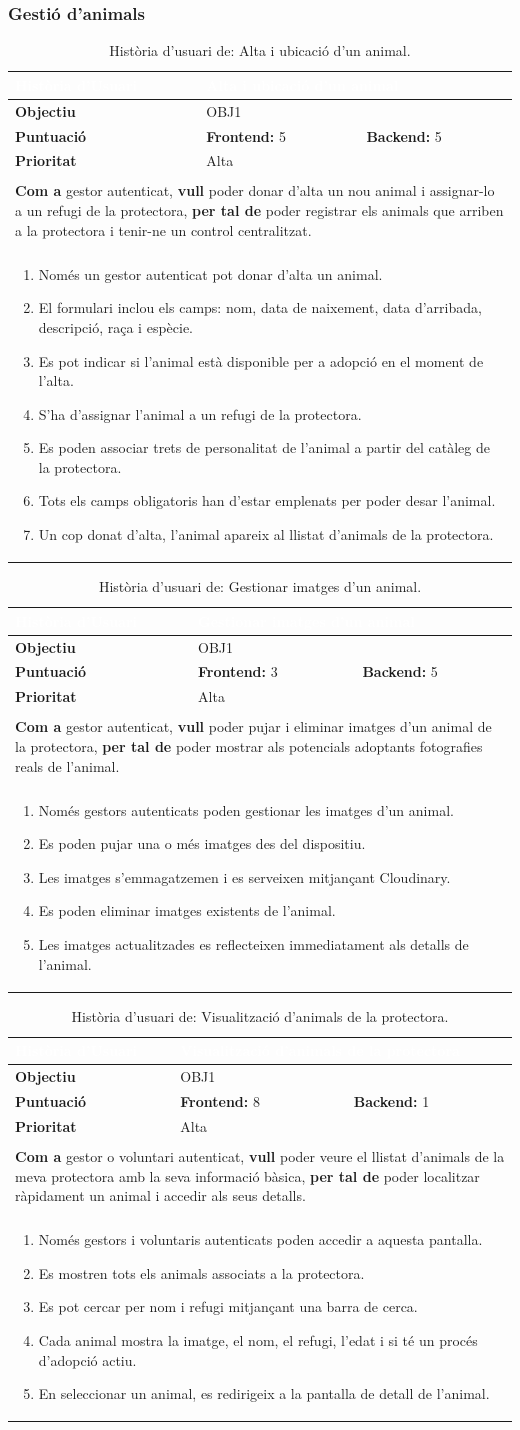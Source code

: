 \documentclass[11pt,a4paper]{report}
\newcommand{\HU}[9]{%
\begin{table}[H]\centering\footnotesize\renewcommand{\arraystretch}{1.1}%
\setlength{\extrarowheight}{0pt}%
\begin{tabular}{|l|p{4.8cm}|p{4.8cm}|}\hline
\rowcolor{oceanblue}\textcolor{white}{\textbf{Història d'Usuari}} & \multicolumn{2}{l|}{\textcolor{white}{#2}} \\\hline
\textbf{Objectiu} & \multicolumn{2}{l|}{#1} \\\hline
\rowcolor{gray!10}\textbf{Puntuació} & \textbf{Frontend: } #3 & \textbf{Backend: } #4 \\\hline
\textbf{Prioritat} & \multicolumn{2}{l|}{#5} \\\hline
\rowcolor{oceanblue}\multicolumn{3}{|l|}{\textcolor{white}{\textbf{Descripció}}} \\\hline
\multicolumn{3}{|p{12.5cm}|}{\textbf{Com a} #6, \textbf{vull} #7, \textbf{per tal de} #8.} \\\hline
\rowcolor{oceanblue}\multicolumn{3}{|l|}{\textcolor{white}{\textbf{Criteris d'Acceptació}}} \\\hline
\multicolumn{3}{|p{12.5cm}|}{\begin{enumerate}[leftmargin=0.4cm,topsep=0pt,parsep=0pt,itemsep=1pt,partopsep=0pt,after=\vspace{-3pt}] #9 \end{enumerate}} \\\hline
\end{tabular}\caption[HU: #2]{Història d'usuari de: #2.}\label{tab:hu_#1}\end{table}%
}
\begin{document}
\subsubsection{Gestió d'animals}
    \HU{OBJ1}
    {Alta i ubicació d'un animal}
    {5}
    {5}
    {Alta}
    {gestor autenticat}
    {poder donar d'alta un nou animal i assignar-lo a un refugi de la protectora}
    {poder registrar els animals que arriben a la protectora i tenir-ne un control centralitzat}
    {
        \item Només un gestor autenticat pot donar d'alta un animal.
        \item El formulari inclou els camps: nom, data de naixement, data d'arribada, descripció, raça i espècie.
        \item Es pot indicar si l'animal està disponible per a adopció en el moment de l'alta.
        \item S'ha d'assignar l'animal a un refugi de la protectora.
        \item Es poden associar trets de personalitat de l'animal a partir del catàleg de la protectora.
        \item Tots els camps obligatoris han d'estar emplenats per poder desar l'animal.
        \item Un cop donat d'alta, l'animal apareix al llistat d'animals de la protectora.
    }
    \HU{OBJ1}
    {Gestionar imatges d'un animal}
    {3}
    {5}
    {Alta}
    {gestor autenticat}
    {poder pujar i eliminar imatges d'un animal de la protectora}
    {poder mostrar als potencials adoptants fotografies reals de l'animal}
    {
        \item Només gestors autenticats poden gestionar les imatges d'un animal.
        \item Es poden pujar una o més imatges des del dispositiu.
        \item Les imatges s'emmagatzemen i es serveixen mitjançant Cloudinary.
        \item Es poden eliminar imatges existents de l'animal.
        \item Les imatges actualitzades es reflecteixen immediatament als detalls de l'animal.
    }
    \HU{OBJ1}
    {Visualització d'animals de la protectora}
    {8}
    {1}
    {Alta}
    {gestor o voluntari autenticat}
    {poder veure el llistat d'animals de la meva protectora amb la seva informació bàsica}
    {poder localitzar ràpidament un animal i accedir als seus detalls}
    {
        \item Només gestors i voluntaris autenticats poden accedir a aquesta pantalla.
        \item Es mostren tots els animals associats a la protectora.
        \item Es pot cercar per nom i refugi mitjançant una barra de cerca.
        \item Cada animal mostra la imatge, el nom, el refugi, l'edat i si té un procés d'adopció actiu.
        \item En seleccionar un animal, es redirigeix a la pantalla de detall de l'animal.
    }
\end{document}
